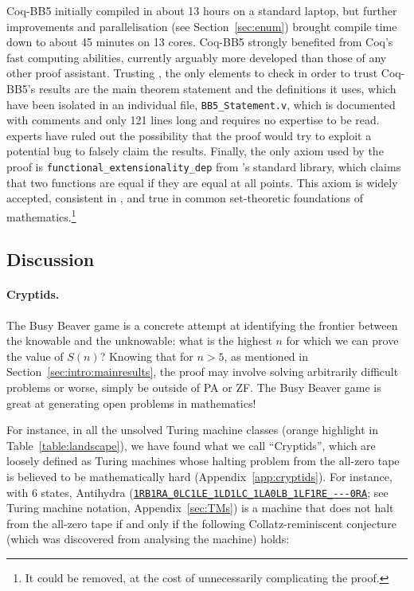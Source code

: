 \documentclass[letterpaper,british,11pt]{article}
\theoremstyle{definition} %
\numberwithin{equation}{section}
\theoremstyle{definition} %
\newcommand{\tm}[1]{\href{https://bbchallenge.org/#1}{\texttt{\nolinkurl{#1}}}}
\newcommand{\CoqBB}{Coq-BB5\xspace}
\begin{document}
\enlargethispage{\baselineskip}
\CoqBB initially compiled in about 13 hours on a standard laptop, but further improvements and parallelisation (see Section~\ref{sec:enum}) brought compile time down to about 45 minutes on 13 cores. \CoqBB strongly benefited from Coq’s fast computing abilities, currently arguably more developed than those of any other proof assistant. Trusting \Coq, the only elements to check in order to trust \CoqBB's results are the main theorem statement and the definitions it uses, which have been isolated in an individual file, \texttt{BB5\_Statement.v}, which is documented with comments and only 121 lines long and requires no \Coq expertise to be read. \Coq experts have ruled out the possibility that the proof would try to exploit a potential \Coq bug to falsely claim the results. Finally, the only axiom used by the proof is \texttt{functional\_extensionality\_dep} from \Coq's standard library, which claims that two functions are equal if they are equal at all points. This axiom is widely accepted, consistent in \Coq, and true in common set-theoretic foundations of mathematics.\footnote{It could be removed, at the cost of unnecessarily complicating the proof.}


\subsection{Discussion}\label{sec:intro:discuss}

\paragraph{Cryptids.} The Busy Beaver game is a concrete attempt at identifying the frontier between the knowable and the unknowable: what is the highest $n$ for which we can prove the value of $S(n)$? Knowing that for $n > 5$, as mentioned in Section~\ref{sec:intro:mainresults}, the proof may involve solving arbitrarily difficult problems or worse, simply be outside of PA or ZF. The Busy Beaver game is great at generating open problems in mathematics!


For instance, in all the unsolved Turing machine classes (orange highlight in Table~\ref{table:landscape}), we have found what we call ``Cryptids'', which are loosely defined as Turing machines whose halting problem from the all-zero tape is believed to be mathematically hard (Appendix~\ref{app:cryptids}). For instance, with 6 states, Antihydra (\tm{1RB1RA_0LC1LE_1LD1LC_1LA0LB_1LF1RE_---0RA}; see Turing machine notation, Appendix~\ref{sec:TMs}) is a machine that does not halt from the all-zero tape if and only if the following Collatz-reminiscent conjecture (which was discovered from analysing the machine) holds:
\end{document}
